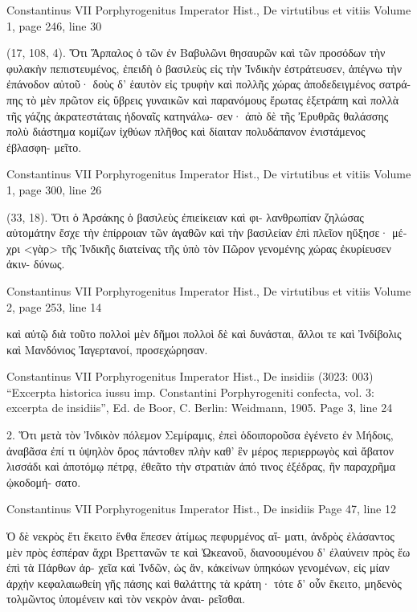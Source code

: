 \documentclass[12pt,letterpaper,twoside,final]{memoir}
\begin{document}
\begin{greek}
Constantinus VII Porphyrogenitus Imperator Hist., De virtutibus et vitiis 
Volume 1, page 246, line 30

       (17, 108, 4). Ὅτι Ἅρπαλος ὁ τῶν ἐν Βαβυλῶνι θησαυρῶν 
καὶ τῶν προσόδων τὴν φυλακὴν πεπιστευμένος, ἐπειδὴ ὁ βασιλεὺς 
εἰς τὴν Ἰνδικὴν ἐστράτευσεν, ἀπέγνω τὴν ἐπάνοδον αὐτοῦ· δοὺς 
δ' ἑαυτὸν εἰς τρυφὴν καὶ πολλῆς χώρας ἀποδεδειγμένος σατρά-
πης τὸ μὲν πρῶτον εἰς ὕβρεις γυναικῶν καὶ παρανόμους ἔρωτας 
ἐξετράπη καὶ πολλὰ τῆς γάζης ἀκρατεστάταις ἡδοναῖς κατηνάλω-
σεν· ἀπὸ δὲ τῆς Ἐρυθρᾶς θαλάσσης πολὺ διάστημα κομίζων 
ἰχθύων πλῆθος καὶ δίαιταν πολυδάπανον ἐνιστάμενος ἐβλασφη-  
μεῖτο. 



Constantinus VII Porphyrogenitus Imperator Hist., De virtutibus et vitiis 
Volume 1, page 300, line 26

       (33, 18). Ὅτι ὁ Ἀρσάκης ὁ βασιλεὺς ἐπιείκειαν καὶ φι-
λανθρωπίαν ζηλώσας αὐτομάτην ἔσχε τὴν ἐπίρροιαν τῶν ἀγαθῶν 
καὶ τὴν βασιλείαν ἐπὶ πλεῖον ηὔξησε· μέχρι <γὰρ> τῆς Ἰνδικῆς 
διατείνας τῆς ὑπὸ τὸν Πῶρον γενομένης χώρας ἐκυρίευσεν ἀκιν-
δύνως. 



Constantinus VII Porphyrogenitus Imperator Hist., De virtutibus et vitiis 
Volume 2, page 253, line 14

                                                      καὶ αὐτῷ διὰ 
τοῦτο πολλοὶ μὲν δῆμοι πολλοὶ δὲ καὶ δυνάσται, ἄλλοι τε καὶ 
Ἰνδίβολις καὶ Μανδόνιος Ἰαγερτανοί, προσεχώρησαν. 



Constantinus VII Porphyrogenitus Imperator Hist., De insidiis (3023: 003)
“Excerpta historica iussu imp. Constantini Porphyrogeniti confecta, vol. 3: excerpta de insidiis”, Ed. de Boor, C.
Berlin: Weidmann, 1905.
Page 3, line 24

2. Ὅτι μετὰ τὸν Ἰνδικὸν πόλεμον Σεμίραμις, ἐπεὶ ὁδοιποροῦσα 
ἐγένετο ἐν Μήδοις, ἀναβᾶσα ἐπί τι ὑψηλὸν ὄρος πάντοθεν πλὴν 
καθ' ἓν μέρος περιερρωγὸς καὶ ἄβατον λισσάδι καὶ ἀποτόμῳ πέτρᾳ, 
ἐθεᾶτο τὴν στρατιὰν ἀπό τινος ἐξέδρας, ἣν παραχρῆμα ᾠκοδομή-
σατο. 



Constantinus VII Porphyrogenitus Imperator Hist., De insidiis 
Page 47, line 12

Ὁ δὲ νεκρὸς ἔτι ἔκειτο ἔνθα ἔπεσεν ἀτίμως πεφυρμένος αἵ-
ματι, ἀνδρὸς ἐλάσαντος μὲν πρὸς ἑσπέραν ἄχρι Βρεττανῶν τε καὶ 
Ὠκεανοῦ, διανοουμένου δ' ἐλαύνειν πρὸς ἕω ἐπὶ τὰ Πάρθων ἀρ-
χεῖα καὶ Ἰνδῶν, ὡς ἄν, κἀκείνων ὑπηκόων γενομένων, εἰς μίαν 
ἀρχὴν κεφαλαιωθείη γῆς πάσης καὶ θαλάττης τὰ κράτη· τότε δ' 
οὖν ἔκειτο, μηδενὸς τολμῶντος ὑπομένειν καὶ τὸν νεκρὸν ἀναι-
ρεῖσθαι. 




\end{greek}
\end{document}
